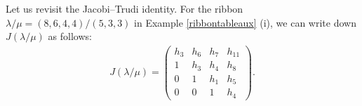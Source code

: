 \documentclass[numbers=enddot,12pt,final,onecolumn,notitlepage]{scrartcl}%
\theoremstyle{definition}
\newtheorem{remk}[theo]{Remark}
\newenvironment{remark}[1][]
{\begin{remk}[#1]\begin{leftbar}}
{\end{leftbar}\end{remk}}
\newtheorem{exam}[theo]{Example}
\newenvironment{example}[1][]
{\begin{exam}[#1]\begin{leftbar}}
{\end{leftbar}\end{exam}}
\theoremstyle{plainsl}
\begin{document}
Let us revisit the Jacobi--Trudi identity. For the ribbon  $\lambda/\mu= (8,6,4,4)/(5,3,3)$ in Example \ref{ribbontableaux} (i), we can write down $J(\lambda/\mu)$ as follows:
\begin{align*}
J(\lambda/\mu)
= %
\begin{pmatrix}
h_3 & h_6 & h_7 & h_{11} \\
1 & h_3 & h_4 & h_8 \\
0 & 1 & h_1 & h_5 \\
0 & 0 & 1 & h_4
\end{pmatrix} .
\end{align*}








\end{document}
